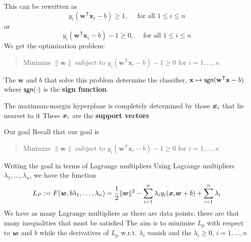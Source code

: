 \documentclass[aspectratio=169]{beamer}\usepackage[]{graphicx}\usepackage[]{xcolor}
\begin{document}
\begin{frame}
    This can be rewritten as
    \[
        y_i(\mathbf{w}^\mathsf{T} \mathbf{x}_i - b) \ge 1, \quad \text{ for all } 1 \le i \le n
    \]
    or
    \[
        y_i(\mathbf{w}^\mathsf{T} \mathbf{x}_i - b)-1\geq 0, \quad \text{ for all } 1 \le i \le n
    \]
    \vfill
    We get the optimization problem:
    \begin{quote}
        Minimize $\|\mathbf{w}\|$ subject to $y_i(\mathbf{w}^\mathsf{T} \mathbf{x}_i - b)-1 \ge 0$ for $i = 1, \ldots, n$
    \end{quote}
    \vfill
    The $\mathbf{w}$ and $b$ that solve this problem determine the classifier, $\mathbf{x} \mapsto \mathsf{sgn}(\mathbf{w}^\mathsf{T} \mathbf{x} - b)$ where $\mathsf{sgn}(\cdot)$ is the \textbf{sign function}.
\end{frame}

\begin{frame}   
    The maximum-margin hyperplane is completely determined by those $\bm{x}_i$ that lie nearest to it
    \vfill
    These $\bm{x}_i$ are the \textbf{support vectors}
\end{frame}





\begin{frame}{Our goal}
    Recall that our goal is
    \vfill
    \begin{quote}
        Minimize $\|\mathbf{w}\|$ subject to $y_i(\mathbf{w}^\mathsf{T} \mathbf{x}_i - b)-1 \ge 0$ for $i = 1, \ldots, n$
    \end{quote}
\end{frame}    


\begin{frame}{Writing the goal in terms of Lagrange multipliers}
    Using Lagrange multipliers $\lambda_1,\ldots,\lambda_n$, we have the function
    \[
        L_P:=F(\bm{w},b\lambda_1,\ldots,\lambda_n) =
        \frac 12\|\bm{w}\|^2 -\sum_{i=1}^n \lambda_iy_i(\bm{x}_i\bm{w}+b)
        +\sum_{i=1}^n\lambda_i
    \]
    \vfill
    We have as many Lagrange multipliers as there are data points: there are that many inequalities that must be satisfied
    \vfill 
    The aim is to minimise $L_p$ with respect to $\bm{w}$ and $b$ while the derivatives of $L_p$ w.r.t. $\lambda_i$ vanish and the $\lambda_i\geq 0$, $i=1,\ldots,n$
\end{frame}
\end{document}
